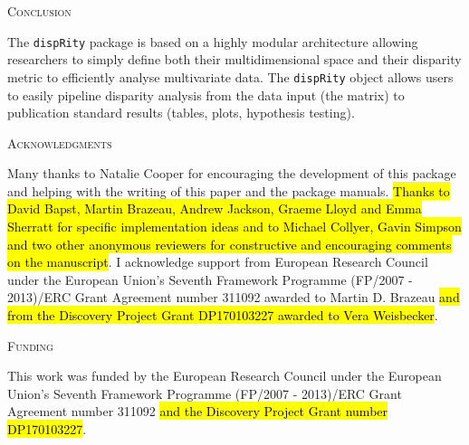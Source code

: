\documentclass[12pt,letterpaper]{article}
\renewcommand{\section}[1]{%
\bigskip
\begin{center}
\begin{Large}
\normalfont\scshape #1
\medskip
\end{Large}
\end{center}}
\newcommand{\disp}{\texttt{dispRity} }
\begin{document}
\section{Conclusion}
The \disp package is based on a highly modular architecture allowing researchers to simply define both their multidimensional space and their disparity metric to efficiently analyse multivariate data.
The \disp object allows users to easily pipeline disparity analysis from the data input (the matrix) to publication standard results (tables, plots, hypothesis testing).


\section{Acknowledgments}
Many thanks to Natalie Cooper for encouraging the development of this package and helping with the writing of this paper and the package manuals.
\hl{Thanks to David Bapst, Martin Brazeau, Andrew Jackson, Graeme Lloyd and Emma Sherratt for specific implementation ideas  and to Michael Collyer, Gavin Simpson and two other anonymous reviewers for constructive and encouraging comments on the manuscript}.
I acknowledge support from European Research Council under the European Union's Seventh Framework Programme (FP/2007 - 2013)/ERC Grant Agreement number 311092 awarded to Martin D. Brazeau 
\hl{and from the Discovery Project Grant DP170103227 awarded to Vera Weisbecker}.


\section{Funding}
This work was funded by the European Research Council under the European Union's Seventh Framework Programme (FP/2007 - 2013)/ERC Grant Agreement number 311092 
\hl{and the Discovery Project Grant number DP170103227}.



\end{document}
